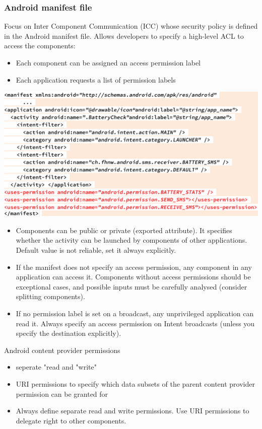 \documentclass[10pt]{article}
\begin{document}
\subsubsection{Android manifest file}
Focus on Inter Component Communication (ICC) whose security policy is defined in the Android manifest file. Allows developers to specify a high-level ACL to access the components:
\begin{itemize}
	\item Each component can be assigned an access permission label
	\item Each application requests a list of permission labels
\end{itemize}
\begin{center}
\includegraphics[scale=0.4]{AndroidManifest.png}
\end{center}
\begin{itemize}
	\item Components can be public or private (exported attribute). It specifies whether the activity can be launched by components of other applications. Default value is not reliable, set it always explicitly.
	\item If the manifest does not specify an access permission, any component in any application can access it. Components without access permissions should be exceptional cases, and possible inputs must be carefully analysed (consider splitting components). 
	\item If no permission label is set on a broadcast, any unprivileged application can read it. Always specify an access permission on Intent broadcasts (unless you specify the destination explicitly). 
\end{itemize}

Android content provider permissions
\begin{itemize}
	\item seperate "read and "write"
	\item URI permissions to specify which data subsets of the parent content provider permission can be granted for
	\item Always define separate read and write permissions. Use URI permissions to delegate right to other components.
\end{itemize}
\end{document}
